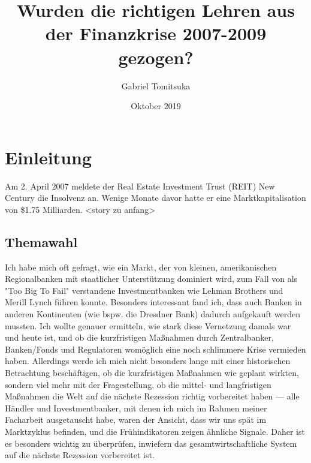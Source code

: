 \documentclass[a4paper,draft]{report}
\begin{document}
\title{Wurden die richtigen Lehren aus der
Finanzkrise 2007-2009 gezogen?}
\author{Gabriel Tomitsuka}
\date{Oktober 2019}
\maketitle
\tableofcontents
\section{Einleitung}
Am 2. April 2007 meldete der Real Estate Investment Trust (REIT) New Century die Insolvenz an.
Wenige Monate davor hatte er eine
Marktkapitalisation von \$1.75 Milliarden.
<story zu anfang>
\subsection{Themawahl}
Ich habe mich oft gefragt, wie ein Markt, der
von kleinen, amerikanischen Regionalbanken mit
staatlicher Unterstützung
dominiert wird, zum Fall von als "Too Big To
Fail" verstandene Investmentbanken wie Lehman
Brothers und Merill Lynch
führen konnte. Besonders interessant fand ich,
dass auch Banken in anderen Kontinenten (wie
bspw. die Dresdner Bank) dadurch
aufgekauft werden mussten. Ich wollte genauer
ermitteln, wie stark diese Vernetzung damals
war und heute ist, und ob
die kurzfristigen Maßnahmen durch
Zentralbanker, Banken/Fonds und Regulatoren
womöglich eine noch schlimmere Krise
vermieden haben.
Allerdings werde ich mich nicht besonders
lange mit einer historischen Betrachtung
beschäftigen, ob die kurzfristigen
Maßnahmen wie geplant wirkten, sondern viel
mehr mit der Fragestellung, ob die mittel- und
langfristigen Maßnahmen die Welt
auf die nächste Rezession richtig vorbereitet
haben --- alle Händler und Investmentbanker, mit
denen ich mich im Rahmen meiner Facharbeit ausgetauscht habe, waren
der Ansicht, dass wir uns spät im Marktzyklus
befinden, und die Frühindikatoren zeigen
ähnliche Signale.
Daher ist es besonders wichtig zu
überprüfen, inwiefern das gesamtwirtschaftliche System auf die nächste Rezession vorbereitet ist.
\end{document}
